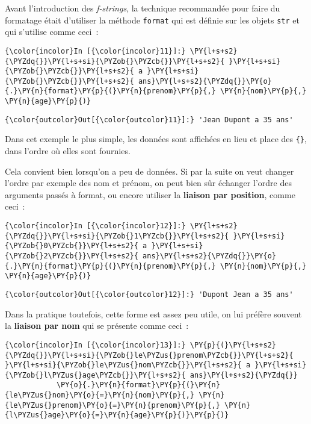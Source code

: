     Avant l'introduction des \emph{f-strings}, la technique recommandée pour
faire du formatage était d'utiliser la méthode \texttt{format} qui est
définie sur les objets \texttt{str} et qui s'utilise comme ceci~:

    \begin{Verbatim}[commandchars=\\\{\}]
{\color{incolor}In [{\color{incolor}11}]:} \PY{l+s+s2}{\PYZdq{}}\PY{l+s+si}{\PYZob{}\PYZcb{}}\PY{l+s+s2}{ }\PY{l+s+si}{\PYZob{}\PYZcb{}}\PY{l+s+s2}{ a }\PY{l+s+si}{\PYZob{}\PYZcb{}}\PY{l+s+s2}{ ans}\PY{l+s+s2}{\PYZdq{}}\PY{o}{.}\PY{n}{format}\PY{p}{(}\PY{n}{prenom}\PY{p}{,} \PY{n}{nom}\PY{p}{,} \PY{n}{age}\PY{p}{)}
\end{Verbatim}


\begin{Verbatim}[commandchars=\\\{\}]
{\color{outcolor}Out[{\color{outcolor}11}]:} 'Jean Dupont a 35 ans'
\end{Verbatim}
            
    Dans cet exemple le plus simple, les données sont affichées en lieu et
place des \texttt{\{\}}, dans l'ordre où elles sont fournies.

    Cela convient bien lorsqu'on a peu de données. Si par la suite on veut
changer l'ordre par exemple des nom et prénom, on peut bien sûr échanger
l'ordre des arguments passés à format, ou encore utiliser la
\textbf{liaison par position}, comme ceci~:

    \begin{Verbatim}[commandchars=\\\{\}]
{\color{incolor}In [{\color{incolor}12}]:} \PY{l+s+s2}{\PYZdq{}}\PY{l+s+si}{\PYZob{}1\PYZcb{}}\PY{l+s+s2}{ }\PY{l+s+si}{\PYZob{}0\PYZcb{}}\PY{l+s+s2}{ a }\PY{l+s+si}{\PYZob{}2\PYZcb{}}\PY{l+s+s2}{ ans}\PY{l+s+s2}{\PYZdq{}}\PY{o}{.}\PY{n}{format}\PY{p}{(}\PY{n}{prenom}\PY{p}{,} \PY{n}{nom}\PY{p}{,} \PY{n}{age}\PY{p}{)}
\end{Verbatim}


\begin{Verbatim}[commandchars=\\\{\}]
{\color{outcolor}Out[{\color{outcolor}12}]:} 'Dupont Jean a 35 ans'
\end{Verbatim}
            
    Dans la pratique toutefois, cette forme est assez peu utile, on lui
préfère souvent la \textbf{liaison par nom} qui se présente comme ceci~:

    \begin{Verbatim}[commandchars=\\\{\}]
{\color{incolor}In [{\color{incolor}13}]:} \PY{p}{(}\PY{l+s+s2}{\PYZdq{}}\PY{l+s+si}{\PYZob{}le\PYZus{}prenom\PYZcb{}}\PY{l+s+s2}{ }\PY{l+s+si}{\PYZob{}le\PYZus{}nom\PYZcb{}}\PY{l+s+s2}{ a }\PY{l+s+si}{\PYZob{}l\PYZus{}age\PYZcb{}}\PY{l+s+s2}{ ans}\PY{l+s+s2}{\PYZdq{}}
            \PY{o}{.}\PY{n}{format}\PY{p}{(}\PY{n}{le\PYZus{}nom}\PY{o}{=}\PY{n}{nom}\PY{p}{,} \PY{n}{le\PYZus{}prenom}\PY{o}{=}\PY{n}{prenom}\PY{p}{,} \PY{n}{l\PYZus{}age}\PY{o}{=}\PY{n}{age}\PY{p}{)}\PY{p}{)}
\end{Verbatim}


